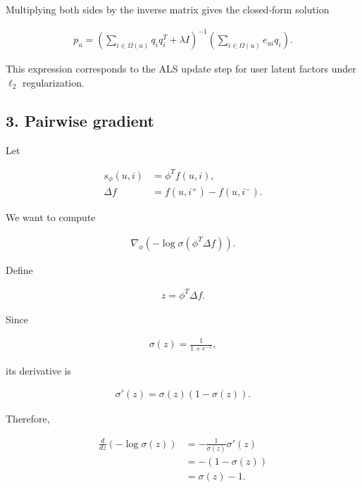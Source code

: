 \documentclass[11pt]{article}
\begin{document}
\begin{appendices}
\noindent Multiplying both sides by the inverse matrix gives the closed-form solution

\begin{align*}
    p_u
    =
    \left(
    \sum_{i \in \Omega(u)}
    q_i q_i^T
    +
    \lambda I
    \right)^{-1}
    \left(
    \sum_{i \in \Omega(u)}
    e_{ui} q_i
    \right).
\end{align*}

\noindent This expression corresponds to the ALS update step for user latent factors under $\ell_2$ regularization.

\vspace{1cm}

\subsection*{3. Pairwise gradient}

\noindent Let

\begin{align*}
    s_\phi(u,i) &= \phi^T f(u,i), \\
    \Delta f &= f(u,i^+) - f(u,i^-).
\end{align*}

\noindent We want to compute

\begin{align*}
    \nabla_\phi \left(-\log \sigma(\phi^T \Delta f)\right).
\end{align*}

\noindent Define

\begin{align*}
    z = \phi^T \Delta f.
\end{align*}

\noindent Since

\begin{align*}
    \sigma(z) = \frac{1}{1+e^{-z}},
\end{align*}

\noindent its derivative is

\begin{align*}
    \sigma'(z) = \sigma(z)(1-\sigma(z)).
\end{align*}

\noindent Therefore,

\begin{align*}
    \frac{d}{dz}\left(-\log\sigma(z)\right)
    &=
    -\frac{1}{\sigma(z)}\sigma'(z) \\
    &=
    -(1-\sigma(z)) \\
    &=
    \sigma(z)-1.
\end{align*}


\end{appendices}
\end{document}
